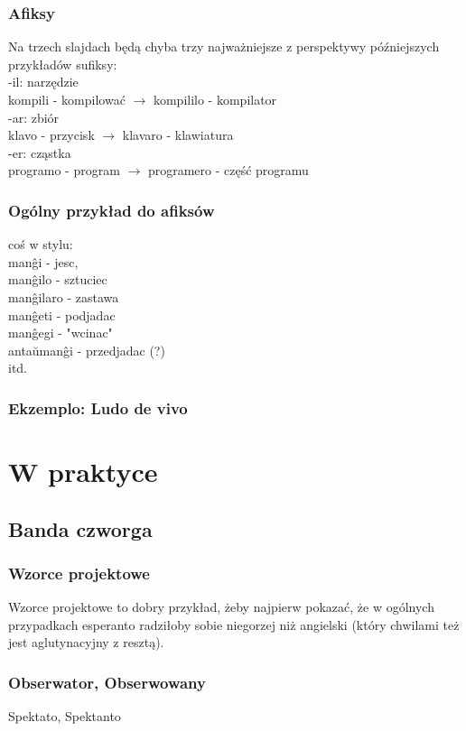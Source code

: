 \documentclass{beamer}
\begin{document}
  \begin{frame}
  	\frametitle{Afiksy}

	Na trzech slajdach będą chyba trzy najważniejsze z perspektywy późniejszych przykładów sufiksy:\\
		-il: narzędzie \\ kompili - kompilować $\rightarrow$ kompililo - kompilator \\
		-ar: zbiór\\ klavo - przycisk $\rightarrow$ klavaro - klawiatura\\
		-er: cząstka \\ programo - program $\rightarrow$ programero - część programu\\

  \end{frame}

  \begin{frame}
  	\frametitle{Ogólny przykład do afiksów}
  	
  	coś w stylu:\\
  	manĝi - jesc,\\
  	manĝilo - sztuciec\\
  	manĝilaro - zastawa\\
  	manĝeti - podjadac\\
  	manĝegi - "wcinac"\\
  	antaŭmanĝi - przedjadac (?)\\
  	itd.

  \end{frame}
 
  
  \begin{frame}
    \frametitle{Ekzemplo: Ludo de vivo}
  \end{frame}
  
  \section{W praktyce}
  \subsection{Banda czworga}
  
  \begin{frame}
  \frametitle{Wzorce projektowe}
  Wzorce projektowe to dobry przykład, żeby najpierw pokazać, że w ogólnych przypadkach esperanto radziłoby sobie niegorzej niż angielski (który chwilami też jest aglutynacyjny z resztą).
  \end{frame}  

  \begin{frame}
  \frametitle{Obserwator, Obserwowany}
  Spektato, Spektanto
  \end{frame}  
  
\end{document}

